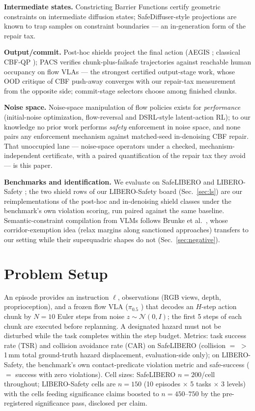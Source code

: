\documentclass[conference]{IEEEtran}
\begin{document}
\textbf{Intermediate states.} Constricting Barrier Functions \cite{cbf2602} certify geometric constraints on intermediate diffusion states; SafeDiffuser-style projections \cite{safediffuser} are known to trap samples on constraint boundaries --- an in-generation form of the repair tax.

\textbf{Output/commit.} Post-hoc shields project the final action (AEGIS \cite{aegis}; classical CBF-QP \cite{ames2019cbf,brunke2025semantic}); PACS \cite{pacs} verifies chunk-plus-failsafe trajectories against reachable human occupancy on flow VLAs --- the strongest certified output-stage work, whose OOD critique of CBF push-away converges with our repair-tax measurement from the opposite side; commit-stage selectors choose among finished chunks.

\textbf{Noise space.} Noise-space manipulation of flow policies exists for \emph{performance} (initial-noise optimization, flow-reversal and DSRL-style latent-action RL); to our knowledge no prior work performs \emph{safety} enforcement in noise space, and none pairs any enforcement mechanism against matched-seed in-denoising CBF repair. That unoccupied lane --- noise-space operators under a checked, mechanism-independent certificate, with a paired quantification of the repair tax they avoid --- is this paper.

\textbf{Benchmarks and identification.} We evaluate on SafeLIBERO \cite{sota2607} and LIBERO-Safety \cite{liberosafety}; the two shield rows of our LIBERO-Safety board (Sec.~\ref{sec:ls}) are our reimplementations of the post-hoc and in-denoising shield classes under the benchmark's own violation scoring, run paired against the same baseline. Semantic-constraint compilation from VLMs follows Brunke et al.\ \cite{brunke2025semantic}, whose corridor-exemption idea (relax margins along sanctioned approaches) transfers to our setting while their superquadric shapes do not (Sec.~\ref{sec:negative}).

\section{Problem Setup}
\label{sec:setup}

An episode provides an instruction $\ell$, observations (RGB views, depth, proprioception), and a frozen flow VLA ($\pi_{0.5}$ \cite{pi05}) that decodes an $H$-step action chunk by $N{=}10$ Euler steps from noise $z\sim\mathcal N(0,I)$; the first 5 steps of each chunk are executed before replanning. A designated hazard must not be disturbed while the task completes within the step budget. Metrics: task success rate (TSR) and collision avoidance rate (CAR) on SafeLIBERO (collision $=$ $>$1\,mm total ground-truth hazard displacement, evaluation-side only); on LIBERO-Safety, the benchmark's own contact-predicate violation metric and safe-success ($=$ success with zero violations). Cell sizes: SafeLIBERO $n{=}200$/cell throughout; LIBERO-Safety cells are $n{=}150$ (10 episodes $\times$ 5 tasks $\times$ 3 levels) with the cells feeding significance claims boosted to $n{=}450$--$750$ by the pre-registered significance pass, disclosed per claim.
\end{document}
